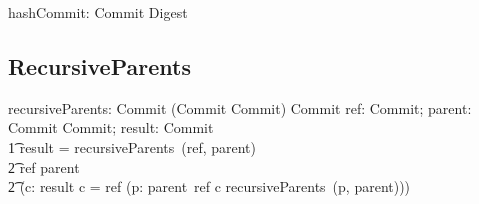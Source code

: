 \begin{axdef}
  hashCommit: Commit \surj Digest
\end{axdef}

\subsection{RecursiveParents}

\begin{axdef}
  recursiveParents: Commit \cross (Commit \pfun \power Commit) \pfun \power Commit
\where
  \exists ref: Commit; parent: Commit \pfun \power Commit; result: \power Commit \spot \\
  \t1 result = recursiveParents~(ref, parent) \iff \\
    \t2 ref \in \dom parent \land \\
    \t2 (\forall c: result \spot c = ref \lor (\exists p: parent~ref \spot c \in recursiveParents~(p, parent)))
\end{axdef}
